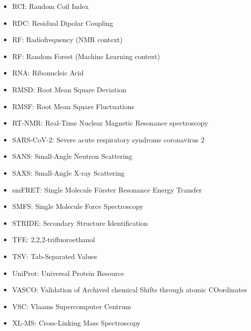 \begin{itemize}
    \item RCI: Random Coil Index
    \item RDC: Residual Dipolar Coupling
    \item RF: Radiofrequency (NMR context)
    \item RF: Random Forest (Machine Learning context)
    \item RNA: Ribonucleic Acid
    \item RMSD: Root Mean Square Deviation
    \item RMSF: Root Mean Square Fluctuations
    \item RT-NMR: Real-Time Nuclear Magnetic Resonance spectroscopy
    \item SARS-CoV-2: Severe acute respiratory syndrome coronavirus 2
    \item SANS: Small-Angle Neutron Scattering
    \item SAXS: Small-Angle X-ray Scattering
    \item smFRET: Single Molecule Förster Resonance Energy Transfer
    \item SMFS: Single Molecule Force Spectroscopy
    \item STRIDE: Secondary Structure Identification
    \item TFE: 2,2,2-trifluoroethanol
    \item TSV: Tab-Separated Values
    \item UniProt: Universal Protein Resource
    \item VASCO: Validation of Archived chemical Shifts through atomic COordinates
    \item VSC: Vlaams Supercomputer Centrum
    \item XL-MS: Cross-Linking Mass Spectroscopy
\end{itemize}


